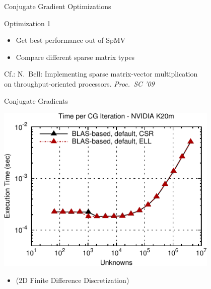 
\begin{frame}[fragile]{Conjugate Gradient Optimizations}

 \vspace*{2cm}
 \begin{block}{Optimization 1}
   \begin{itemize}
   \item Get best performance out of SpMV
   \item Compare different sparse matrix types
  \end{itemize}
 \end{block}

 \vspace*{2cm}
    {\small Cf.: N.~Bell: Implementing sparse matrix-vector multiplication\\ on throughput-oriented processors. \textit{Proc.~SC '09}}


\end{frame}


\begin{frame}[fragile]{Conjugate Gradients}
 \begin{block}{}
 \begin{center}
  \vspace*{-0.5cm}
  \includegraphics[width=0.8\textwidth]{figures/cg-k20m-1}
 \end{center}

 \begin{itemize}
  \item   \vspace*{-0.3cm} {\small (2D Finite Difference Discretization)}
 \end{itemize}
 \end{block}   
\end{frame}

